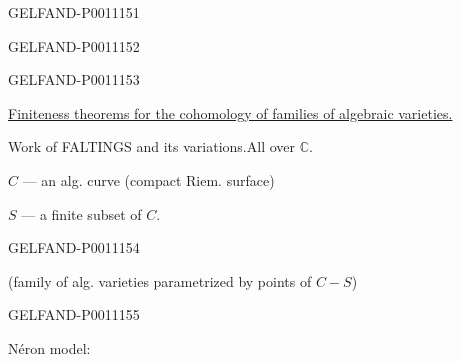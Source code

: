 \begin{GelfandAdjacentEvidence}{GELFAND-P001115}{1}
\end{GelfandAdjacentEvidence}
\begin{GelfandAdjacentEvidence}{GELFAND-P001115}{2}


\end{GelfandAdjacentEvidence}
\begin{GelfandAdjacentEvidence}{GELFAND-P001115}{3}

\underline{Finiteness theorems for the cohomology of families of algebraic varieties.}

Work of FALTINGS and its variations.\quad All over $\mathbb C$.

$C$ — an alg. curve (compact Riem. surface)

$S$ — a finite subset of $C$.

\end{GelfandAdjacentEvidence}
\begin{GelfandAdjacentEvidence}{GELFAND-P001115}{4}

(family of alg. varieties parametrized by points of $C-S$)

\end{GelfandAdjacentEvidence}
\begin{GelfandAdjacentEvidence}{GELFAND-P001115}{5}


Néron model:
\end{GelfandAdjacentEvidence}
